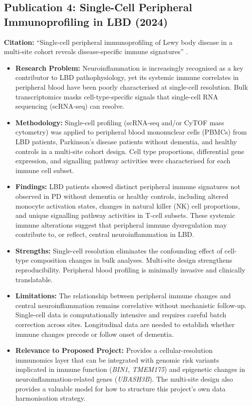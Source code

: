 \subsection{Publication 4: Single-Cell Peripheral Immunoprofiling in LBD (2024)}
\textbf{Citation:} ``Single-cell peripheral immunoprofiling of Lewy body disease in a multi-site cohort reveals disease-specific immune signatures'' \cite{singlecell2024immune}.

\begin{itemize}
    \item \textbf{Research Problem:} Neuroinflammation is increasingly recognised as a key contributor to LBD pathophysiology, yet its systemic immune correlates in peripheral blood have been poorly characterised at single-cell resolution. Bulk transcriptomics masks cell-type-specific signals that single-cell RNA sequencing (scRNA-seq) can resolve.
    \item \textbf{Methodology:} Single-cell profiling (scRNA-seq and/or CyTOF mass cytometry) was applied to peripheral blood mononuclear cells (PBMCs) from LBD patients, Parkinson's disease patients without dementia, and healthy controls in a multi-site cohort design. Cell type proportions, differential gene expression, and signalling pathway activities were characterised for each immune cell subset.
    \item \textbf{Findings:} LBD patients showed distinct peripheral immune signatures not observed in PD without dementia or healthy controls, including altered monocyte activation states, changes in natural killer (NK) cell proportions, and unique signalling pathway activities in T-cell subsets. These systemic immune alterations suggest that peripheral immune dysregulation may contribute to, or reflect, central neuroinflammation in LBD.
    \item \textbf{Strengths:} Single-cell resolution eliminates the confounding effect of cell-type composition changes in bulk analyses. Multi-site design strengthens reproducibility. Peripheral blood profiling is minimally invasive and clinically translatable.
    \item \textbf{Limitations:} The relationship between peripheral immune changes and central neuroinflammation remains correlative without mechanistic follow-up. Single-cell data is computationally intensive and requires careful batch correction across sites. Longitudinal data are needed to establish whether immune changes precede or follow onset of dementia.
    \item \textbf{Relevance to Proposed Project:} Provides a cellular-resolution immunomics layer that can be integrated with genomic risk variants implicated in immune function (\textit{BIN1}, \textit{TMEM175}) and epigenetic changes in neuroinflammation-related genes (\textit{UBASH3B}). The multi-site design also provides a valuable model for how to structure this project's own data harmonisation strategy.
\end{itemize}

